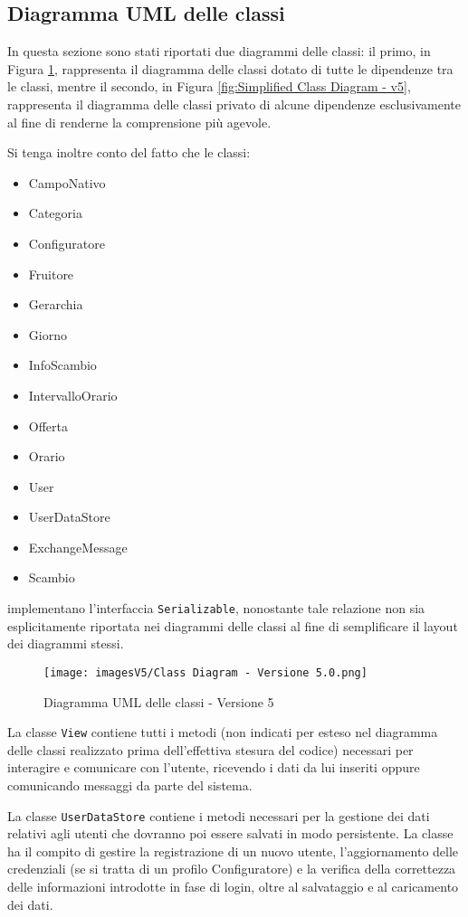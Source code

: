 \subsection{Diagramma UML delle classi}
In questa sezione sono stati riportati due diagrammi delle classi: il primo, in Figura \ref{fig:Class Diagram - v5}, rappresenta il diagramma delle classi dotato di tutte le dipendenze tra le classi, mentre il secondo, in Figura \ref{fig:Simplified Class Diagram - v5}, rappresenta il diagramma delle classi privato di alcune dipendenze esclusivamente al fine di renderne la comprensione più agevole.

Si tenga inoltre conto del fatto che le classi:
\begin{itemize}
    \item CampoNativo
    \item Categoria
    \item Configuratore
    \item Fruitore
    \item Gerarchia
    \item Giorno
    \item InfoScambio
    \item IntervalloOrario
    \item Offerta
    \item Orario
    \item User
    \item UserDataStore
    \item ExchangeMessage
    \item Scambio
\end{itemize}
implementano l'interfaccia \texttt{Serializable}, nonostante tale relazione non sia esplicitamente riportata nei diagrammi delle classi al fine di semplificare il layout dei diagrammi stessi.

\begin{figure}[h!]
    \centering
    \texttt{[image: imagesV5/Class Diagram - Versione 5.0.png]}
    \caption{\label{fig:Class Diagram - v5}Diagramma UML delle classi - Versione 5}
\end{figure} 

La classe \texttt{View} contiene tutti i metodi (non indicati per esteso nel diagramma delle classi realizzato prima dell'effettiva stesura del codice) necessari per interagire e comunicare con l'utente, ricevendo i dati da lui inseriti oppure comunicando messaggi da parte del sistema.

La classe \texttt{UserDataStore} contiene i metodi necessari per la gestione dei dati relativi agli utenti che dovranno poi essere salvati in modo persistente. La classe ha il compito di gestire la registrazione di un nuovo utente, l'aggiornamento delle credenziali (se si tratta di un profilo Configuratore) e la verifica della correttezza delle informazioni introdotte in fase di login, oltre al salvataggio e al caricamento dei dati. 


